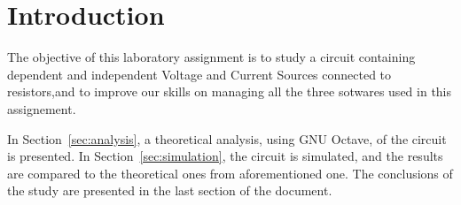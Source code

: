 \section{Introduction}
\label{sec:introduction}



The objective of this laboratory assignment is to study a circuit containing dependent and independent Voltage and Current Sources connected to resistors,and to improve our skills on managing all the three sotwares used in this assignement.
\vspace{1cm}


In Section~\ref{sec:analysis}, a theoretical analysis, using GNU Octave, of the circuit is presented. In Section~\ref{sec:simulation}, the circuit is simulated, and the results are compared to the theoretical ones from
aforementioned one. The conclusions of the study are presented in the last section of the document.
